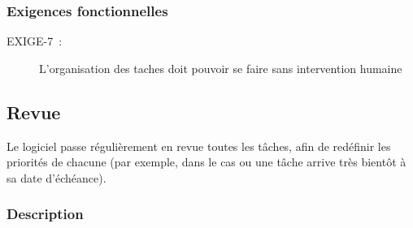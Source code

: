 \subsubsection{Exigences fonctionnelles}
\begin{description}
 \item[EXIGE-7~:] L'organisation des taches doit pouvoir se faire sans intervention humaine
 \end{description}



	\subsection{Revue}

Le logiciel passe régulièrement en revue toutes les tâches, afin de redéfinir les priorités de chacune (par exemple, dans le cas ou une tâche arrive très bientôt à sa date d'échéance).

\subsubsection{Description}

